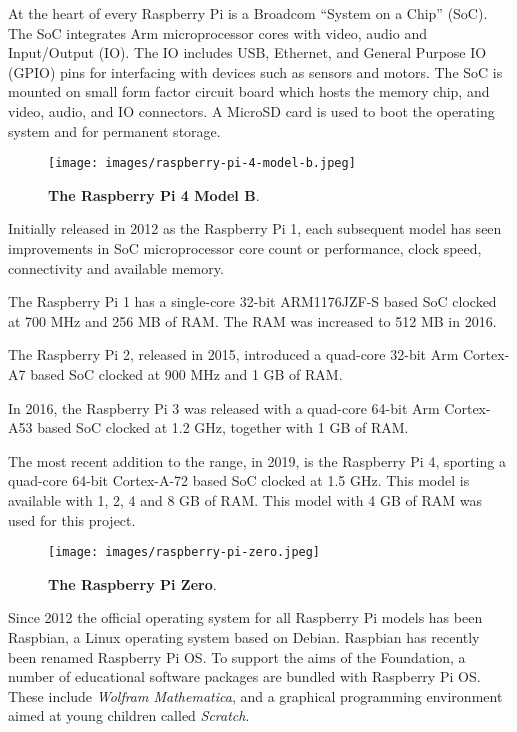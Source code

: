At the heart of every Raspberry Pi is a Broadcom ``System on a Chip'' (SoC). The SoC integrates Arm microprocessor cores with video, audio and Input/Output (IO). The IO includes USB, Ethernet, and General Purpose IO (GPIO) pins for interfacing with devices such as sensors and motors. The SoC is mounted on small form factor circuit board which hosts the memory chip, and video, audio, and IO connectors. A MicroSD card is used to boot the operating system and for permanent storage.

\begin{figure}
	\centering	
	\texttt{[image: images/raspberry-pi-4-model-b.jpeg]}
	\caption{\textbf{The Raspberry Pi 4 Model B}.}
\end{figure}

Initially released in 2012 as the Raspberry Pi 1, each subsequent model has seen improvements in SoC microprocessor core count or performance, clock speed, connectivity and available memory.

The Raspberry Pi 1 has a single-core 32-bit ARM1176JZF-S based SoC clocked at 700 MHz and 256 MB of RAM. The RAM was increased to 512 MB in 2016.

The Raspberry Pi 2, released in 2015, introduced a quad-core 32-bit Arm Cortex-A7 based SoC clocked at 900 MHz and 1 GB of RAM.

In 2016, the Raspberry Pi 3 was released with a quad-core 64-bit Arm Cortex-A53 based SoC clocked at 1.2 GHz, together with 1 GB of RAM.

The most recent addition to the range, in 2019, is the Raspberry Pi 4, sporting a quad-core 64-bit Cortex-A-72 based SoC clocked at 1.5 GHz. This model is available with 1, 2, 4 and 8 GB of RAM. This model with 4 GB of RAM was used for this project.

\begin{figure}
	\centering	
	\texttt{[image: images/raspberry-pi-zero.jpeg]}
	\caption{\textbf{The Raspberry Pi Zero}.}
\end{figure}

Since 2012 the official operating system for all Raspberry Pi models has been Raspbian, a Linux operating system based on Debian. Raspbian has recently been renamed Raspberry Pi OS. To support the aims of the Foundation, a number of educational software packages are bundled with Raspberry Pi OS. These include \emph{Wolfram Mathematica}, and a graphical programming environment aimed at young children called \emph{Scratch}.

